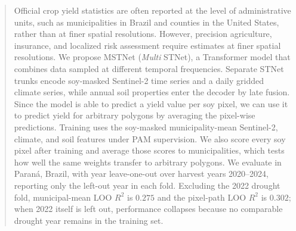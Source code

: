 \begin{abstract}
Official crop yield statistics are often reported at the level of administrative units, such as municipalities in Brazil and counties in the United States, rather than at finer spatial resolutions.
However, precision agriculture, insurance, and localized risk assessment require estimates at finer spatial resolutions.
We propose MSTNet (\emph{Multi} STNet), a Transformer model that combines data sampled at different temporal frequencies.
Separate STNet trunks encode soy-masked Sentinel-2 time series and a daily gridded climate series, while annual soil properties enter the decoder by late fusion.
Since the model is able to predict a yield value per soy pixel, we can use it to predict yield for arbitrary polygons by averaging the pixel-wise predictions.
Training uses the soy-masked municipality-mean Sentinel-2, climate, and soil features under PAM supervision.
We also score every soy pixel after training and average those scores to municipalities, which tests how well the same weights transfer to arbitrary polygons.
We evaluate in Paran\'{a}, Brazil, with year leave-one-out over harvest years 2020--2024, reporting only the left-out year in each fold.
Excluding the 2022 drought fold, municipal-mean LOO $R^2$ is $0.275$ and the pixel-path LOO $R^2$ is $0.302$; when 2022 itself is left out, performance collapses because no comparable drought year remains in the training set.
\end{abstract}
